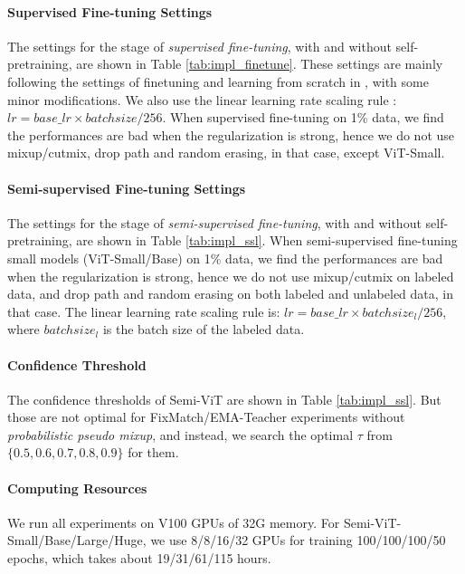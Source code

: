 \documentclass{article}
\begin{document}
\paragraph{Supervised Fine-tuning Settings}  
The settings for the stage of \emph{supervised fine-tuning}, with and without self-pretraining, are shown in Table \ref{tab:impl_finetune}. These settings are mainly following the settings of finetuning and learning from scratch in \cite{he2021masked}, with some minor modifications. We also use the linear learning rate scaling rule \cite{DBLP:journals/corr/GoyalDGNWKTJH17}: $lr=base\_lr\times{batchsize}/256$. When supervised fine-tuning on 1\% data, we find the performances are bad when the regularization is strong, hence we do not use mixup/cutmix, drop path and random erasing, in that case, except ViT-Small. 

\paragraph{Semi-supervised Fine-tuning Settings}
The settings for the stage of \emph{semi-supervised fine-tuning}, with and without self-pretraining, are shown in Table \ref{tab:impl_ssl}. When semi-supervised fine-tuning small models (ViT-Small/Base) on 1\% data, we find the performances are bad when the regularization is strong, hence we do not use mixup/cutmix on labeled data, and drop path and random erasing on both labeled and unlabeled data, in that case. The linear learning rate scaling rule is: $lr=base\_lr\times{batchsize_l}/256$, where $batchsize_l$ is the batch size of the labeled data.


\paragraph{Confidence Threshold} The confidence thresholds of Semi-ViT are shown in Table \ref{tab:impl_ssl}. But those are not optimal for FixMatch/EMA-Teacher experiments without \emph{probabilistic pseudo mixup}, and instead, we search the optimal $\tau$ from $\{0.5,0.6,0.7,0.8,0.9\}$ for them.


\paragraph{Computing Resources} We run all experiments on V100 GPUs of 32G memory. For Semi-ViT-Small/Base/Large/Huge, we use 8/8/16/32 GPUs for training 100/100/100/50 epochs, which takes about 19/31/61/115 hours.
\end{document}
